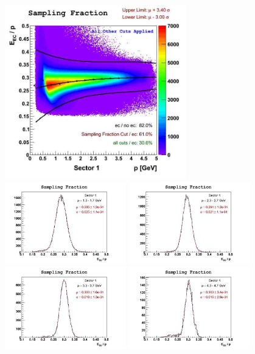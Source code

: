 \begin{figure}[h]
  \centering
		\includegraphics[width=0.7\textwidth] {img/sampling_fit_sect1.jpg}
		\includegraphics[width=0.47\textwidth]{img/slice5_fit_sect1.jpg}
		\includegraphics[width=0.47\textwidth]{img/slice8_fit_sect1.jpg}
		\includegraphics[width=0.47\textwidth]{img/slice11_fit_sect1.jpg}
		\includegraphics[width=0.47\textwidth]{img/slice14_fit_sect1.jpg}

\end{figure}

